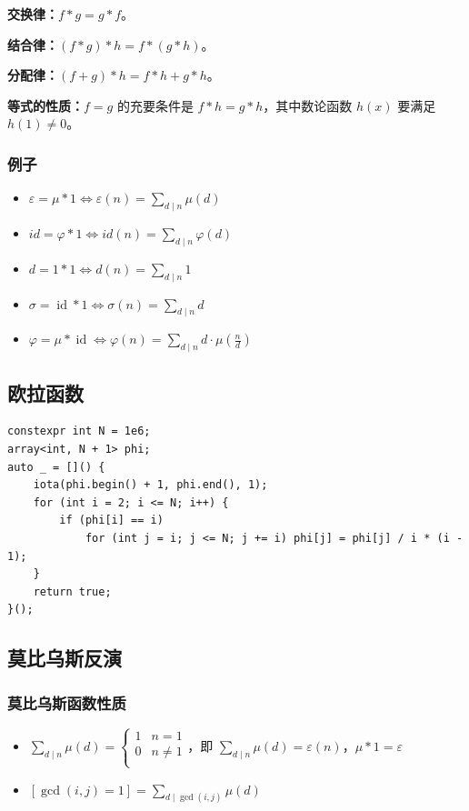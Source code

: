 \documentclass[UTF8, twoside]{ctexart}
\begin{document}
\begin{sloppypar}
\textbf{交换律：}$f*g=g*f$。

\textbf{结合律：}$(f*g)*h=f*(g*h)$。

\textbf{分配律：}$(f+g)*h=f*h+g*h$。

\textbf{等式的性质：}$f=g$ 的充要条件是 $f*h=g*h$，其中数论函数 $h(x)$ 要满足 $h(1)\ne 0$。

\subsubsection{例子}

\begin{itemize}
   \item $\varepsilon=\mu \ast 1\iff\varepsilon(n)=\sum_{d\mid n}\mu(d)$
   \item $id = \varphi * 1 \iff id(n)=\sum_{d\mid n} \varphi(d)$
   \item $d=1 \ast 1\iff d(n)=\sum_{d\mid n}1$
   \item $\sigma=\operatorname{id} \ast 1\iff\sigma(n)=\sum_{d\mid n}d$
   \item $\varphi=\mu \ast \operatorname{id}\iff\varphi(n)=\sum_{d\mid n}d\cdot\mu(\frac{n}{d})$
\end{itemize}

\subsection{欧拉函数}

\begin{lstlisting}[style=cpp]
constexpr int N = 1e6;
array<int, N + 1> phi;
auto _ = []() {
    iota(phi.begin() + 1, phi.end(), 1);
    for (int i = 2; i <= N; i++) {
        if (phi[i] == i)
            for (int j = i; j <= N; j += i) phi[j] = phi[j] / i * (i - 1);
    }
    return true;
}();
\end{lstlisting}

\subsection{莫比乌斯反演}

\subsubsection{莫比乌斯函数性质}

\begin{itemize}
   \item $\sum_{d\mid n}\mu(d)=\begin{cases}1&n=1\\0&n\neq 1\\\end{cases}$，即 $\sum_{d\mid n}\mu(d)=\varepsilon(n)$，$\mu * 1 =\varepsilon$
   \item $\displaystyle [\gcd(i,j)=1]=\sum_{d\mid\gcd(i,j)}\mu(d)$
\end{itemize}


\end{sloppypar}
\end{document}
